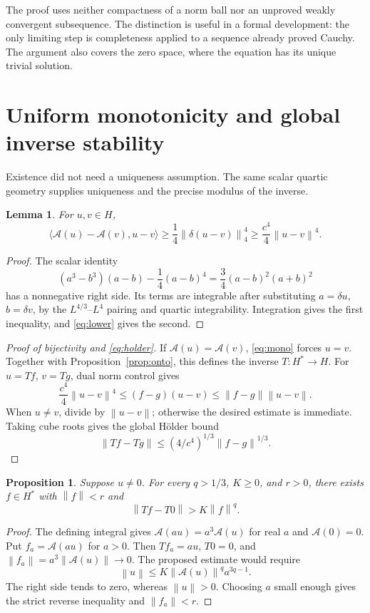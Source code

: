 \documentclass[11pt]{article}
\newtheorem{lemma}[theorem]{Lemma}
\newtheorem{proposition}[theorem]{Proposition}
\theoremstyle{remark}\newtheorem{remark}[theorem]{Remark}
\newcommand{\norm}[1]{\left\lVert#1\right\rVert}
\newcommand{\pair}[2]{\langle #1,#2\rangle}
\newcommand{\A}{\mathcal A}
\begin{document}
The proof uses neither compactness of a norm ball nor an unproved
weakly convergent subsequence. The distinction is useful in a formal
development: the only limiting step is completeness applied to a
sequence already proved Cauchy. The argument also covers the zero
space, where the equation has its unique trivial solution.

\section{Uniform monotonicity and global inverse stability}
Existence did not need a uniqueness assumption. The same scalar
quartic geometry supplies uniqueness and the precise modulus of the
inverse.

\begin{lemma}\label{lem:mono}
For $u,v\in H$,
\begin{equation}\label{eq:mono}
 \pair{\A(u)-\A(v)}{u-v}
 \geq\frac14\norm{\delta(u-v)}_4^4
 \geq\frac{c^4}{4}\norm{u-v}^4.
\end{equation}
\end{lemma}
\begin{proof}
The scalar identity
\[
 (a^3-b^3)(a-b)-\frac14(a-b)^4
 =\frac34(a-b)^2(a+b)^2
\]
has a nonnegative right side. Its terms are integrable after substituting
$a=\delta u$, $b=\delta v$, by the $L^{4/3}$--$L^4$ pairing and
quartic integrability. Integration gives the first inequality, and
\eqref{eq:lower} gives the second.
\end{proof}

\begin{proof}[Proof of bijectivity and \eqref{eq:holder}]
If $\A(u)=\A(v)$, \eqref{eq:mono} forces $u=v$.
Together with Proposition~\ref{prop:onto}, this defines the inverse
$T:H^*\to H$. For $u=Tf$, $v=Tg$, dual norm control gives
\[
 \frac{c^4}{4}\norm{u-v}^4
 \leq(f-g)(u-v)\leq\norm{f-g}\norm{u-v}.
\]
When $u\neq v$, divide by $\norm{u-v}$; otherwise the desired estimate
is immediate. Taking cube roots gives the global H\"older bound
\[
 \norm{Tf-Tg}\leq(4/c^4)^{1/3}\norm{f-g}^{1/3}.
\]
\end{proof}

\begin{proposition}\label{prop:origin}
Suppose $u\neq0$. For every $q>1/3$, $K\geq0$, and $r>0$, there
exists $f\in H^*$ with $\norm f<r$ and
\[
 \norm{Tf-T0}>K\norm f^q.
\]
\end{proposition}
\begin{proof}
The defining integral gives $\A(au)=a^3\A(u)$ for real $a$ and
$\A(0)=0$. Put $f_a=\A(au)$ for $a>0$. Then
$Tf_a=au$, $T0=0$, and $\norm{f_a}=a^3\norm{\A(u)}\to0$.
The proposed estimate would require
\[
 \norm u\leq K\norm{\A(u)}^q a^{3q-1}.
\]
The right side tends to zero, whereas $\norm u>0$. Choosing $a$
small enough gives the strict reverse inequality and $\norm{f_a}<r$.
\end{proof}
\end{document}
